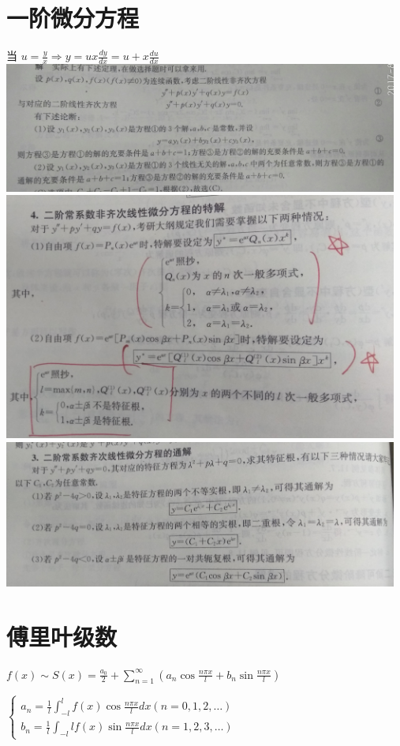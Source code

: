 \documentclass[UTF8]{ctexart}
\begin{document}
\section{一阶微分方程}
    当 $ u=\frac{y}{x} \Rightarrow y=ux\frac{dy}{dx}=u+x\frac{du}{dx}$
\includegraphics[width=13cm]{9345E7/478763472.jpg}
\includegraphics[width=13cm]{9345E7/595734581.jpg}
\includegraphics[width=13cm]{9345E7/601054614.jpg}

\section{傅里叶级数}
$f(x) \sim S(x) = \frac{a_0}{2} + \sum_{n=1}^\infty (a_n \cos{\frac{n  \pi x}{l}
 + b_n \sin \frac{n\pi x}{l}  })$

$\begin{cases}
a_n=\frac{1}{l} \int_{-l}^l f(x) \cos \frac{n \pi x}{l} dx (n=0,1,2, \ldots) \\
b_n=\frac{1}{l} \int_{-l}{l} f(x) \sin \frac{n \pi x}{l} dx (n=1,2,3,\ldots)
\end{cases}$
\end{document}
